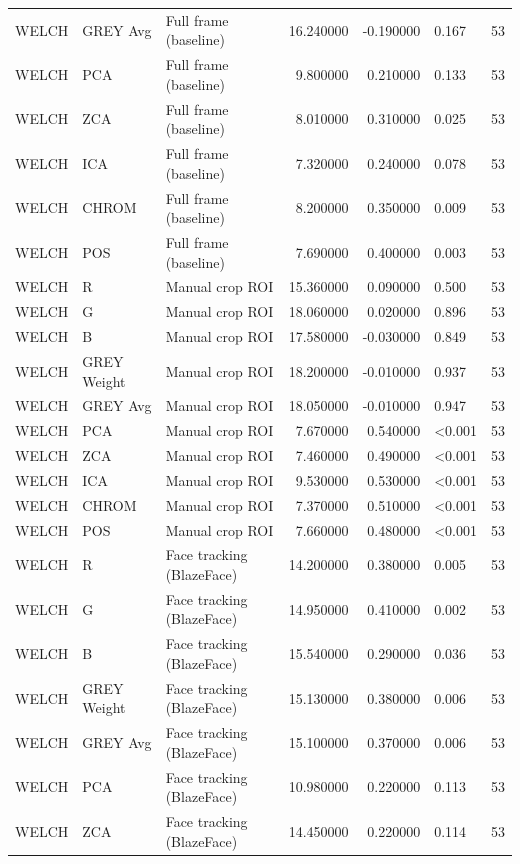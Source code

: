 \begin{table}[htbp]
\begin{tabular}{l l l r r l r}
WELCH & GREY Avg & Full frame (baseline) & 16.240000 & -0.190000 & 0.167 & 53 \\
WELCH & PCA & Full frame (baseline) & 9.800000 & 0.210000 & 0.133 & 53 \\
WELCH & ZCA & Full frame (baseline) & 8.010000 & 0.310000 & 0.025 & 53 \\
WELCH & ICA & Full frame (baseline) & 7.320000 & 0.240000 & 0.078 & 53 \\
WELCH & CHROM & Full frame (baseline) & 8.200000 & 0.350000 & 0.009 & 53 \\
WELCH & POS & Full frame (baseline) & 7.690000 & 0.400000 & 0.003 & 53 \\
WELCH & R & Manual crop ROI & 15.360000 & 0.090000 & 0.500 & 53 \\
WELCH & G & Manual crop ROI & 18.060000 & 0.020000 & 0.896 & 53 \\
WELCH & B & Manual crop ROI & 17.580000 & -0.030000 & 0.849 & 53 \\
WELCH & GREY Weight & Manual crop ROI & 18.200000 & -0.010000 & 0.937 & 53 \\
WELCH & GREY Avg & Manual crop ROI & 18.050000 & -0.010000 & 0.947 & 53 \\
WELCH & PCA & Manual crop ROI & 7.670000 & 0.540000 & <0.001 & 53 \\
WELCH & ZCA & Manual crop ROI & 7.460000 & 0.490000 & <0.001 & 53 \\
WELCH & ICA & Manual crop ROI & 9.530000 & 0.530000 & <0.001 & 53 \\
WELCH & CHROM & Manual crop ROI & 7.370000 & 0.510000 & <0.001 & 53 \\
WELCH & POS & Manual crop ROI & 7.660000 & 0.480000 & <0.001 & 53 \\
WELCH & R & Face tracking (BlazeFace) & 14.200000 & 0.380000 & 0.005 & 53 \\
WELCH & G & Face tracking (BlazeFace) & 14.950000 & 0.410000 & 0.002 & 53 \\
WELCH & B & Face tracking (BlazeFace) & 15.540000 & 0.290000 & 0.036 & 53 \\
WELCH & GREY Weight & Face tracking (BlazeFace) & 15.130000 & 0.380000 & 0.006 & 53 \\
WELCH & GREY Avg & Face tracking (BlazeFace) & 15.100000 & 0.370000 & 0.006 & 53 \\
WELCH & PCA & Face tracking (BlazeFace) & 10.980000 & 0.220000 & 0.113 & 53 \\
WELCH & ZCA & Face tracking (BlazeFace) & 14.450000 & 0.220000 & 0.114 & 53 \\

\end{tabular}
\end{table}

